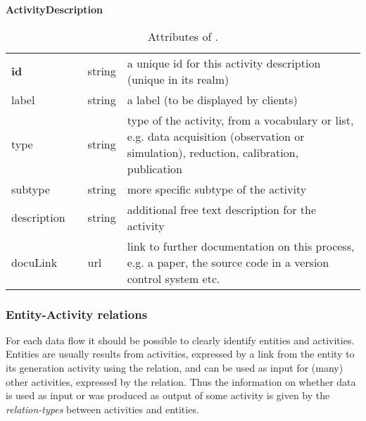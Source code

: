 \begin{table}[ht]
\small
{}\textwidth
\textbf{\normalsize ActivityDescription}\vspace{0.25em}\\
\begin{tabulary}{1.0\textwidth}{@{}p{0cm}p{2.5cm}lL@{}}
\toprule
{} & \head{} &  & \\
\midrule
\textbf{id}  & & string & a unique id for this activity description (unique in its realm)\\
label        & & string & a label (to be displayed by clients)\\
type         & & string & type of the activity, from a vocabulary or list, e.g. data acquisition (observation or simulation), reduction, calibration, publication\\
subtype      & & string & more specific subtype of the activity\\
description  & & string & additional free text description for the activity\\
docuLink     & & url    & link to further documentation on this process, e.g. a paper, the source code in a version control system etc.\\
\bottomrule
\end{tabulary}
\caption{Attributes of .}
\end{table}



\subsubsection{Entity-Activity relations}\label{sec:entity-activity-relations}

For each data flow it should be possible to clearly identify entities and 
activities. 
Entities are usually results from activities, expressed by a link from 
the entity to its generation activity using the  relation,
and can be used as input for (many) other activities, expressed by the  relation.
Thus the information on whether data is used as input or was produced as output of 
some activity is given by the \emph{relation-types} between activities and entities.

